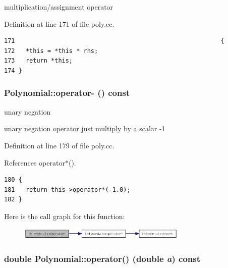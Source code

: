 multiplication/assignment operator 

Definition at line 171 of file poly.cc.

\begin{Code}\begin{verbatim}171                                                         {
172   *this = *this * rhs;
173   return *this;
174 }
\end{verbatim}
\end{Code}


\hypertarget{classPolynomial_d052b311f23798bf5136bd7444fd91d2}{
\subsubsection[operator-]{ Polynomial::operator- () const}}
\label{classPolynomial_d052b311f23798bf5136bd7444fd91d2}


unary negation

unary negation operator just multiply by a scalar -1 

Definition at line 179 of file poly.cc.

References operator$\ast$().

\begin{Code}\begin{verbatim}180 {
181   return this->operator*(-1.0);
182 }
\end{verbatim}
\end{Code}




Here is the call graph for this function:\nopagebreak
\begin{figure}[H]
\begin{center}
\leavevmode
\includegraphics[width=228pt]{classPolynomial_d052b311f23798bf5136bd7444fd91d2_cgraph}
\end{center}
\end{figure}
\hypertarget{classPolynomial_c6eae37f11f87b541fa430de3643a31a}{
\subsubsection[operator()]{\setlength{\rightskip}{0pt plus 5cm}double Polynomial::operator() (double {\em a}) const}}
\label{classPolynomial_c6eae37f11f87b541fa430de3643a31a}



